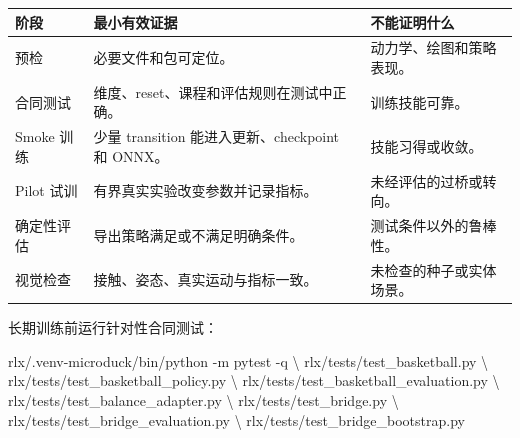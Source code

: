 \documentclass[
  chinese,
  11pt,
  letterpaper,
]{article}
\newenvironment{Shaded}{\begin{snugshade}}{\end{snugshade}}
\newcommand{\AttributeTok}[1]{\textcolor[rgb]{0.13,0.29,0.53}{#1}}
\newcommand{\DataTypeTok}[1]{\textcolor[rgb]{0.13,0.29,0.53}{#1}}
\newcommand{\ExtensionTok}[1]{#1}
\newcommand{\NormalTok}[1]{#1}
\newcounter{none} %
\renewenvironment{Shaded}{\par\smallskip}{\par\smallskip}
\begin{document}
{\def\LTcaptype{none} %
\begin{longtable}[]{@{}
  >{\raggedright\arraybackslash}p{}
  >{\raggedright\arraybackslash}p{}
  >{\raggedright\arraybackslash}p{}@{}}
\toprule\noalign{}
\begin{minipage}[b]{\linewidth}\raggedright
阶段
\end{minipage} & \begin{minipage}[b]{\linewidth}\raggedright
最小有效证据
\end{minipage} & \begin{minipage}[b]{\linewidth}\raggedright
不能证明什么
\end{minipage} \\
\midrule\noalign{}
\endhead
\bottomrule\noalign{}
\endlastfoot
预检 & 必要文件和包可定位。 & 动力学、绘图和策略表现。 \\
合同测试 & 维度、reset、课程和评估规则在测试中正确。 & 训练技能可靠。 \\
Smoke 训练 & 少量 transition 能进入更新、checkpoint 和 ONNX。 &
技能习得或收敛。 \\
Pilot 试训 & 有界真实实验改变参数并记录指标。 &
未经评估的过桥或转向。 \\
确定性评估 & 导出策略满足或不满足明确条件。 & 测试条件以外的鲁棒性。 \\
视觉检查 & 接触、姿态、真实运动与指标一致。 &
未检查的种子或实体场景。 \\
\end{longtable}
}

长期训练前运行针对性合同测试：

\begin{Shaded}
\begin{Highlighting}[]
\ExtensionTok{rlx/.venv{-}microduck/bin/python} \AttributeTok{{-}m}\NormalTok{ pytest }\AttributeTok{{-}q} \DataTypeTok{\textbackslash{}}
\NormalTok{  rlx/tests/test\_basketball.py }\DataTypeTok{\textbackslash{}}
\NormalTok{  rlx/tests/test\_basketball\_policy.py }\DataTypeTok{\textbackslash{}}
\NormalTok{  rlx/tests/test\_basketball\_evaluation.py }\DataTypeTok{\textbackslash{}}
\NormalTok{  rlx/tests/test\_balance\_adapter.py }\DataTypeTok{\textbackslash{}}
\NormalTok{  rlx/tests/test\_bridge.py }\DataTypeTok{\textbackslash{}}
\NormalTok{  rlx/tests/test\_bridge\_evaluation.py }\DataTypeTok{\textbackslash{}}
\NormalTok{  rlx/tests/test\_bridge\_bootstrap.py}
\end{Highlighting}
\end{Shaded}
\end{document}
